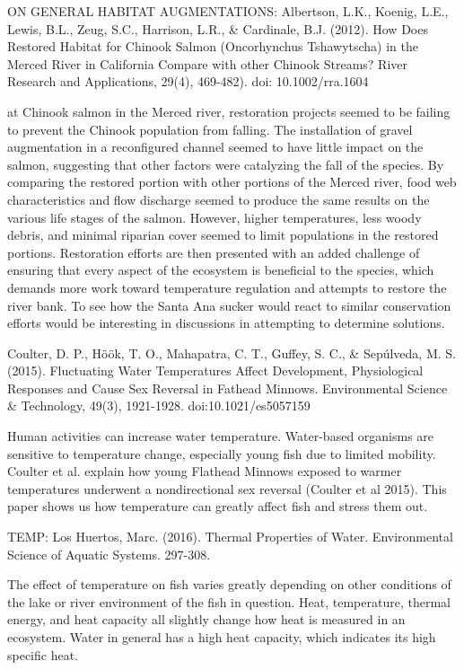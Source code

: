 \documentclass{article}\usepackage[]{graphicx}\usepackage[]{color}
\begin{document}
ON GENERAL HABITAT AUGMENTATIONS: Albertson, L.K., Koenig, L.E., Lewis, B.L., Zeug, S.C., Harrison, L.R., \& Cardinale, B.J. (2012). How Does Restored Habitat for Chinook Salmon (Oncorhynchus Tshawytscha) in the Merced River in California Compare with other Chinook Streams? River Research and Applications, 29(4), 469-482). doi: 10.1002/rra.1604

at Chinook salmon in the Merced river, restoration projects seemed to be failing to prevent the Chinook population from falling. The installation of gravel augmentation in a reconfigured channel seemed to have little impact on the salmon, suggesting that other factors were catalyzing the fall of the species. 
By comparing the restored portion with other portions of the Merced river, food web characteristics and flow discharge seemed to produce the same results on the various life stages of the salmon. However, higher temperatures, less woody debris, and minimal riparian cover seemed to limit populations in the restored portions. 
Restoration efforts are then presented with an added challenge of ensuring that every aspect of the ecosystem is beneficial to the species, which demands more work toward temperature regulation and attempts to restore the river bank. 
To see how the Santa Ana sucker would react to similar conservation efforts would be interesting in discussions in attempting to determine solutions. 

Coulter, D. P., Höök, T. O., Mahapatra, C. T., Guffey, S. C., \& Sepúlveda, M. S. (2015). Fluctuating Water Temperatures Affect Development, Physiological Responses and Cause Sex Reversal in Fathead Minnows. Environmental Science \& Technology, 49(3), 1921-1928. doi:10.1021/es5057159

\citep{coulter2015fluctuating}

Human activities can increase water temperature. Water-based organisms are sensitive to temperature change, especially young fish due to limited mobility. Coulter et al. explain how young Flathead Minnows exposed to warmer temperatures underwent a nondirectional sex reversal (Coulter et al 2015). This paper shows us how temperature can greatly affect fish and stress them out. 

TEMP:
Los Huertos, Marc. (2016). Thermal Properties of Water. Environmental Science of Aquatic Systems. 297-308.

The effect of temperature on fish varies greatly depending on other conditions of the lake or river environment of the fish in question.
Heat, temperature, thermal energy, and heat capacity all slightly change how heat is measured in an ecosystem. Water in general has a high heat capacity, which indicates its high specific heat. 
\end{document}
